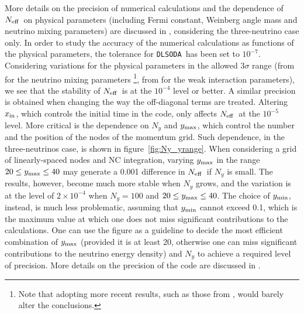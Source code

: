 \documentclass[notitlepage,nofootinbib,showpacs,preprintnumbers,amsmath,amssymb,superscriptaddress,prd,onecolumn]{revtex4-1}
\newcommand{\Neff}{\ensuremath{N_{\rm eff}}}
\newcommand{\dlsoda}{\texttt{DLSODA}}
\begin{document}
More details on the precision of numerical calculations and the dependence of \Neff\ on physical parameters
(including Fermi constant, Weinberg angle mass and neutrino mixing parameters)
are discussed in \cite{Bennett:2020zkv}, considering the three-neutrino case only.
In order to study the accuracy of the numerical calculations as functions of the physical parameters,
the tolerance for \dlsoda\ has been set to $10^{-7}$.
Considering variations for the physical parameters in the allowed $3\sigma$ range
(from \cite{deSalas:2017kay} for the neutrino mixing parameters%
\footnote{Note that adopting more recent results,
such as those from \cite{Capozzi:2020qhw,Esteban:2020cvm,deSalas:2020pgw},
would barely alter the conclusions.},
from \cite{Tanabashi:2018oca,Zyla:2020zbs} for the weak interaction parameters),
we see that the stability of \Neff\ is at the $10^{-4}$ level or better.
A similar precision is obtained when changing the way the off-diagonal terms are treated.
Altering $x_{\rm in}$, which controls the initial time in the code,
only affects \Neff\ at the $10^{-5}$ level.
More critical is the dependence on $N_y$ and $y_{\rm max}$,
which control the number and the position of the nodes of the momentum grid.
Such dependence, in the three-neutrinos case, is shown in figure~\ref{fig:Ny_yrange}.
When considering a grid of linearly-spaced nodes and NC integration,
varying $y_{\rm max}$ in the range $20\leq y_{\rm max}\leq 40$
may generate a 0.001 difference in \Neff\ if $N_y$ is small.
The results, however, become much more stable when $N_y$ grows,
and the variation is at the level of $2\times10^{-4}$
when $N_y=100$ and $20\leq y_{\rm max}\leq 40$.
The choice of $y_{\rm min}$, instead, is much less problematic,
assuming that $y_{\rm min}$ cannot exceed 0.1,
which is the maximum value at which one does not miss significant contributions to the calculations.
One can use the figure as a guideline to decide the most efficient combination
of $y_{\rm max}$ (provided it is at least 20,
otherwise one can miss significant contributions to the neutrino energy density)
and $N_y$ to achieve a required level of precision.
More details on the precision of the code are discussed in \cite{Gariazzo:2019gyi,Bennett:2020zkv}.
\end{document}
